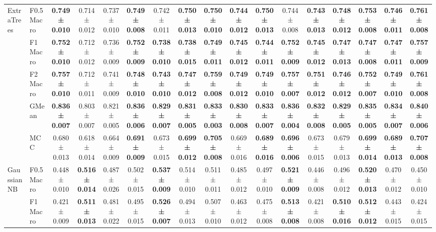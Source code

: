 \begin{table}[H]
{\begin{tabular}{llccccccccccccccc}
\cline{1-17}
\multirow[t]{5}{*}{ExtraTrees} & F0.5 Macro & \textbf{0.749 ± 0.010} & 0.714 ± 0.012 & 0.737 ± 0.010 & \textbf{0.749 ± 0.008} & 0.742 ± 0.011 & \textbf{0.750 ± 0.013} & \textbf{0.750 ± 0.010} & \textbf{0.744 ± 0.012} & \textbf{0.750 ± 0.013} & 0.744 ± 0.008 & \textbf{0.743 ± 0.013} & \textbf{0.748 ± 0.012} & \textbf{0.753 ± 0.008} & \textbf{0.746 ± 0.011} & \textbf{0.761 ± 0.008} \\
 & F1 Macro & \textbf{0.752 ± 0.010} & 0.712 ± 0.012 & 0.736 ± 0.009 & \textbf{0.752 ± 0.009} & \textbf{0.738 ± 0.010} & \textbf{0.738 ± 0.015} & \textbf{0.749 ± 0.011} & \textbf{0.745 ± 0.012} & \textbf{0.744 ± 0.011} & \textbf{0.752 ± 0.009} & \textbf{0.745 ± 0.012} & \textbf{0.747 ± 0.013} & \textbf{0.747 ± 0.008} & \textbf{0.747 ± 0.011} & \textbf{0.757 ± 0.009} \\
 & F2 Macro & \textbf{0.757 ± 0.010} & 0.712 ± 0.011 & 0.741 ± 0.009 & \textbf{0.748 ± 0.010} & \textbf{0.743 ± 0.010} & \textbf{0.747 ± 0.012} & \textbf{0.759 ± 0.008} & \textbf{0.749 ± 0.012} & \textbf{0.749 ± 0.010} & \textbf{0.757 ± 0.007} & \textbf{0.751 ± 0.012} & \textbf{0.746 ± 0.012} & \textbf{0.752 ± 0.007} & \textbf{0.749 ± 0.010} & \textbf{0.761 ± 0.008} \\
 & GMean & \textbf{0.836 ± 0.007} & 0.803 ± 0.007 & 0.821 ± 0.005 & \textbf{0.836 ± 0.006} & \textbf{0.829 ± 0.007} & \textbf{0.831 ± 0.005} & \textbf{0.833 ± 0.003} & \textbf{0.830 ± 0.008} & \textbf{0.833 ± 0.007} & \textbf{0.836 ± 0.004} & \textbf{0.832 ± 0.008} & \textbf{0.829 ± 0.005} & \textbf{0.835 ± 0.005} & \textbf{0.834 ± 0.007} & \textbf{0.840 ± 0.006} \\
 & MCC & 0.680 ± 0.013 & 0.618 ± 0.014 & 0.664 ± 0.009 & \textbf{0.691 ± 0.009} & 0.673 ± 0.015 & \textbf{0.699 ± 0.012} & \textbf{0.705 ± 0.008} & 0.669 ± 0.016 & \textbf{0.689 ± 0.016} & \textbf{0.696 ± 0.006} & 0.673 ± 0.015 & 0.679 ± 0.013 & \textbf{0.699 ± 0.014} & \textbf{0.689 ± 0.013} & \textbf{0.707 ± 0.008} \\
\cline{1-17}
\multirow[t]{5}{*}{GaussianNB} & F0.5 Macro & 0.448 ± 0.010 & \textbf{0.516 ± 0.014} & 0.487 ± 0.026 & 0.502 ± 0.015 & \textbf{0.537 ± 0.009} & 0.514 ± 0.010 & 0.511 ± 0.011 & 0.485 ± 0.012 & 0.497 ± 0.010 & \textbf{0.521 ± 0.009} & 0.446 ± 0.008 & 0.496 ± 0.012 & \textbf{0.520 ± 0.013} & 0.470 ± 0.012 & 0.450 ± 0.010 \\
 & F1 Macro & 0.421 ± 0.009 & \textbf{0.511 ± 0.013} & 0.481 ± 0.022 & 0.495 ± 0.015 & \textbf{0.526 ± 0.007} & 0.494 ± 0.013 & 0.507 ± 0.010 & 0.463 ± 0.012 & 0.475 ± 0.008 & \textbf{0.513 ± 0.008} & 0.421 ± 0.008 & \textbf{0.510 ± 0.016} & \textbf{0.512 ± 0.012} & 0.443 ± 0.015 & 0.424 ± 0.015 \\

\end{tabular}}
\end{table}
